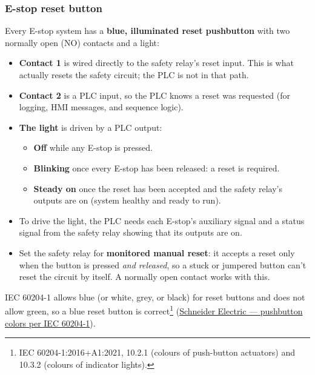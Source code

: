 \subsubsection*{E-stop reset button}
Every E-stop system has a \textbf{blue, illuminated reset pushbutton} with two normally open (NO) contacts and a light:
\begin{itemize}[itemsep=2pt]
  \item \textbf{Contact 1} is wired directly to the safety relay's reset input. This is what actually resets the safety circuit; the PLC is not in that path.
  \item \textbf{Contact 2} is a PLC input, so the PLC knows a reset was requested (for logging, HMI messages, and sequence logic).
  \item \textbf{The light} is driven by a PLC output:
  \begin{itemize}[itemsep=1pt]
    \item \textbf{Off} while any E-stop is pressed.
    \item \textbf{Blinking} once every E-stop has been released: a reset is required.
    \item \textbf{Steady on} once the reset has been accepted and the safety relay's outputs are on (system healthy and ready to run).
  \end{itemize}
  \item To drive the light, the PLC needs each E-stop's auxiliary signal and a status signal from the safety relay showing that its outputs are on.
  \item Set the safety relay for \textbf{monitored manual reset}: it accepts a reset only when the button is pressed \emph{and released}, so a stuck or jumpered button can't reset the circuit by itself. A normally open contact works with this.
\end{itemize}
IEC 60204-1 allows blue (or white, grey, or black) for reset buttons and does not allow green, so a blue reset button is correct\footnote{IEC 60204-1:2016+A1:2021, 10.2.1 (colours of push-button actuators) and 10.3.2 (colours of indicator lights).} (\href{https://www.se.com/uk/en/faqs/FA28043/}{Schneider Electric --- pushbutton colors per IEC 60204-1}).


